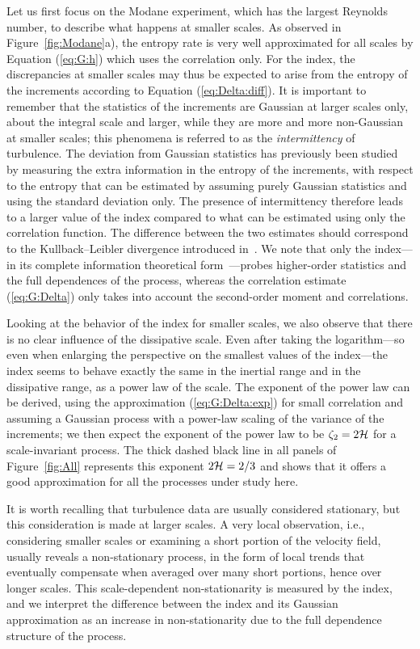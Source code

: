 \documentclass[aps,pra,groupedaddress,notitlepage]{revtex4-1}
\begin{document}
Let us first focus on the Modane experiment, which has the largest Reynolds number, to describe what happens at smaller scales.
As observed in Figure~\ref{fig:Modane}a), the entropy rate is very well approximated for all scales by Equation (\ref{eq:G:h}) which uses the correlation only. For the index, the discrepancies at smaller scales may thus be expected to arise from the entropy of the increments according to Equation (\ref{eq:Delta:diff}). It is important to remember that the statistics of the increments are Gaussian at larger scales only, about the integral scale and larger, while they are more and more non-Gaussian at smaller scales; this phenomena is referred to as the {\em intermittency} of turbulence. 
The deviation from Gaussian statistics has previously been studied~\cite{GraneroBelinchon2018} by measuring the extra information in the entropy of the increments, with respect to the entropy that can be estimated by assuming purely Gaussian statistics and using the standard deviation only. The presence of intermittency therefore leads to a larger value of the index compared to what can be estimated using only the correlation function. The difference between the two estimates should correspond to the Kullback--Leibler divergence introduced in~\cite{GraneroBelinchon2018}. We note that only the index---in its complete information theoretical form~---probes higher-order statistics and the full dependences of the process, whereas the correlation estimate (\ref{eq:G:Delta}) only takes into account the second-order moment and correlations.

Looking at the behavior of the index for smaller scales, we also observe that there is no clear influence of the dissipative scale. 
Even after taking the logarithm---so even when enlarging the perspective on the smallest values of the index---the index seems to behave exactly the same in the inertial range and in the dissipative range, as a power law of the scale.
The exponent of the power law can be derived, using the approximation (\ref{eq:G:Delta:exp}) for small correlation and assuming a Gaussian process with a power-law scaling of the variance of the increments; we then expect the exponent of the power law to be $\zeta_2=2{\cal H}$ for a scale-invariant process. The thick dashed black line in all panels of Figure~\ref{fig:All} represents this exponent $2{\cal H}=2/3$ and shows that it offers a good approximation for all the processes under study here. 


It is worth recalling that turbulence data are usually considered stationary, but this consideration is made at larger scales. A very local observation, {i.e.}, considering smaller scales or examining a short portion of the velocity field, usually reveals a non-stationary process, in the form of local trends that eventually compensate when averaged over many short portions, hence over longer scales. This scale-dependent non-stationarity is measured by the index, and we interpret the difference between the index and its Gaussian approximation as an increase in non-stationarity due to the full dependence structure of the process.
\end{document}
